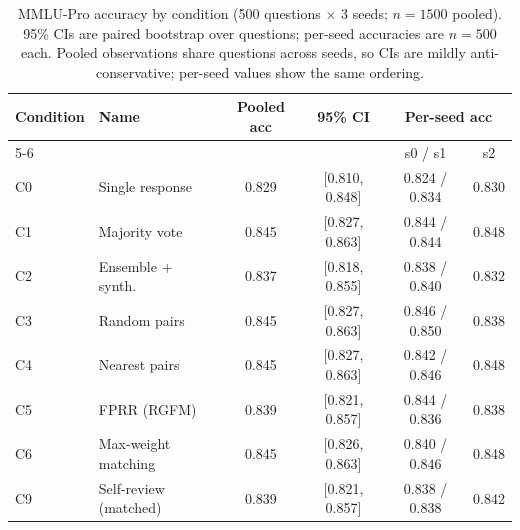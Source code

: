\documentclass[11pt]{article}
\begin{document}
\begin{table}[t]
\centering
\small
\caption{MMLU-Pro accuracy by condition (500 questions $\times$ 3 seeds; $n=1500$ pooled). 95\% CIs are paired bootstrap over questions; per-seed accuracies are $n=500$ each. Pooled observations share questions across seeds, so CIs are mildly anti-conservative; per-seed values show the same ordering.}
\label{tab:mmlu-acc}
\begin{tabular}{llcccc}
\toprule
Condition & Name & Pooled acc & 95\% CI & \multicolumn{2}{c}{Per-seed acc} \\
\cmidrule(lr){5-6}
 & & & & s0 / s1 & s2 \\
\midrule
C0 & Single response      & 0.829 & [0.810, 0.848] & 0.824 / 0.834 & 0.830 \\
C1 & Majority vote        & 0.845 & [0.827, 0.863] & 0.844 / 0.844 & 0.848 \\
C2 & Ensemble + synth.    & 0.837 & [0.818, 0.855] & 0.838 / 0.840 & 0.832 \\
C3 & Random pairs         & 0.845 & [0.827, 0.863] & 0.846 / 0.850 & 0.838 \\
C4 & Nearest pairs        & 0.845 & [0.827, 0.863] & 0.842 / 0.846 & 0.848 \\
C5 & FPRR (RGFM)          & 0.839 & [0.821, 0.857] & 0.844 / 0.836 & 0.838 \\
C6 & Max-weight matching  & 0.845 & [0.826, 0.863] & 0.840 / 0.846 & 0.848 \\
C9 & Self-review (matched)& 0.839 & [0.821, 0.857] & 0.838 / 0.838 & 0.842 \\
\bottomrule
\end{tabular}
\end{table}
\end{document}
